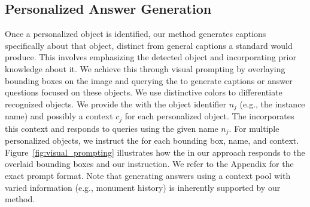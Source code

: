 \subsection{Personalized Answer Generation}
\label{sec:vprompting}
Once a personalized object is identified, our method generates captions specifically about that object, distinct from general captions a standard \VLM would produce. This involves emphasizing the detected object and incorporating prior knowledge about it. We achieve this through visual prompting by overlaying bounding boxes on the image and querying the \VLM to generate captions or answer questions focused on these objects. We use distinctive colors to differentiate recognized objects. 
We provide the \VLM with the object identifier $n_j$ (e.g., the instance name) and possibly a context $c_j$ for each personalized object. The \VLM incorporates this context and responds to queries using the given name $n_j$. For multiple personalized objects, we instruct the \VLM for each bounding box, name, and context. Figure~\ref{fig:visual_prompting} illustrates how the \VLM in our approach responds to the  overlaid bounding boxes and our instruction.
We refer to the Appendix for the exact prompt format. Note that generating answers using a context pool with varied information (e.g., monument history) is inherently supported by our method.
